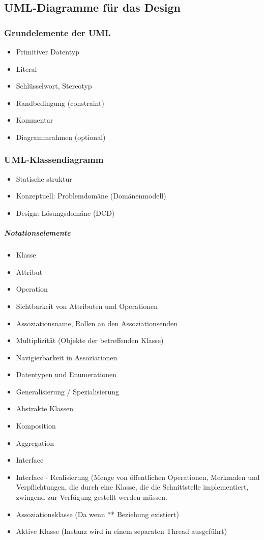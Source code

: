 \documentclass[../ZF_SWEN1.tex]{subfiles}
\begin{document}
\subsection{UML-Diagramme für das Design}
\subsubsection{Grundelemente der UML}
\begin{itemize}
	\item Primitiver Datentyp
	\item Literal
	\item Schlüsselwort, Stereotyp
	\item Randbedingung (constraint)
	\item Kommentar
	\item Diagrammrahmen (optional)
\end{itemize}



\subsubsection{UML-Klassendiagramm}
\begin{itemize}
	\item Statische struktur
	\item Konzeptuell: Problemdomäne (Domänenmodell)
	\item Design: Lösungsdomäne (DCD)
\end{itemize}

\subparagraph{Notationselemente}
\begin{itemize}
	\item Klasse
	\item Attribut
	\item Operation
	\item Sichtbarkeit von Attributen und Operationen
	\item Assoziationsname, Rollen an den Assoziationsenden
	\item Multiplizität (Objekte der betreffenden Klasse)
	\item Navigierbarkeit in Assoziationen
	\item Datentypen und Enumerationen
	\item Generalisierung / Spezialisierung
	\item Abstrakte Klassen
	\item Komposition
	\item Aggregation
	\item Interface
	\item Interface - Realisierung (Menge von öffentlichen Operationen, Merkmalen und Verpflichtungen, die durch eine Klasse, die die Schnittstelle implementiert, zwingend zur Verfügung gestellt werden müssen.
	\item Assoziationsklasse (Da wenn ** Beziehung existiert)
	\item Aktive Klasse (Instanz wird in einem separaten Thread ausgeführt)
\end{itemize}
\end{document}
